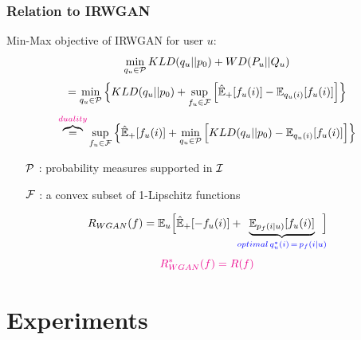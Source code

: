 \documentclass{beamer}
\newcommand{\E}{\mathbb{E}}
\begin{document}
\begin{frame} 
\frametitle{Relation to IRWGAN} 
\begin{block}{Min-Max objective of IRWGAN for user $u$:} \vspace{-3mm}
$$\min_{q_u \in {\cal P}} KLD(q_u || p_0) + WD(P_u || Q_u)$$  \pause \vspace{-2mm}
$$= \min_{q_u \in {\cal P}} \Big\{ KLD(q_u || p_0) + \sup_{f_u \in {\cal F}} \Big[ \hat{\E}_+[f_u(i)] - \E_{q_u(i)}[f_u(i)] \Big] \Big\}$$ \pause \vspace{-2mm} 
$$ \overbrace{=}^{{\color{magenta} duality}} \sup_{f_u \in {\cal F}} \Big\{ \hat{\E}_+[f_u(i)] + \min_{q_u \in {\cal P}} \Big[ KLD(q_u || p_0) - \E_{q_u(i)}[f_u(i)] \Big] \Big\}$$ \pause \vspace{-3mm}
\begin{itemize}
\item[$\cal P$]: probability measures supported in $\cal I$  \vspace{-1mm}
\item[${\cal F}$]: a convex subset of 1-Lipschitz functions
\end{itemize} \pause  \vspace{-2mm}

$$R_{WGAN}(f) = \E_u\Big[\hat{\E}_+[-f_u(i)] + \hspace{-2mm} \underbrace{\E_{p_f(i|u)} [f_u(i)]}_{\color{blue} optimal \, q_u^*(i) \, = \, p_f(i|u)}\hspace{-2mm}\Big]$$ \pause  \vspace{-3mm}
$$\color{magenta}{R^*_{WGAN}(f)  = R(f)}$$  
\end{block} 
\end{frame}


\section{Experiments}
\end{document}
